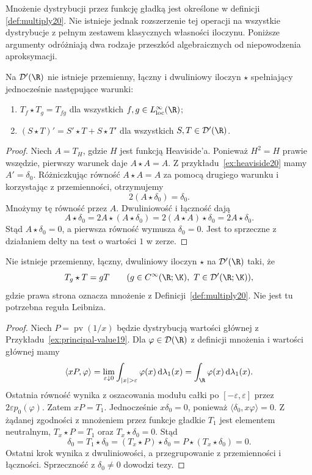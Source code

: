 Mnożenie dystrybucji przez funkcję gładką jest
określone w definicji \ref{def:multiply20}.
Nie istnieje jednak rozszerzenie tej operacji
na wszystkie dystrybucje z pełnym zestawem
klasycznych własności iloczynu. Poniższe argumenty odróżniają dwa rodzaje przeszkód
algebraicznych od niepowodzenia aproksymacji.
\begin{stwierdzenie}
\label{prop:dt-schwartz-obstruction}
Na $\mathcal D'(\R)$ nie istnieje przemienny, łączny
i dwuliniowy iloczyn $\star$ spełniający jednocześnie
następujące warunki:
\begin{enumerate}
\item $T_f\star T_g=T_{fg}$ dla wszystkich
$f,g\in L^\infty_{\mathrm{loc}}(\R)$;
\item $(S\star T)'=S'\star T+S\star T'$ dla wszystkich
$S,T\in\mathcal D'(\R)$.
\end{enumerate}
\end{stwierdzenie}
\begin{proof}
Niech $A=T_H$, gdzie $H$ jest funkcją Heaviside'a.
Ponieważ $H^2=H$ prawie wszędzie, pierwszy warunek
daje $A\star A=A$. Z przykładu~\ref{ex:heaviside20}
mamy $A'=\delta_0$. Różniczkując równość
$A\star A=A$ za pomocą drugiego warunku i korzystając
z przemienności, otrzymujemy
\[
 2(A\star\delta_0)=\delta_0.
\]
Mnożymy tę równość przez $A$. Dwuliniowość i łączność
dają
\[
 A\star\delta_0
 =2A\star(A\star\delta_0)
 =2(A\star A)\star\delta_0
 =2A\star\delta_0.
\]
Stąd $A\star\delta_0=0$, a pierwsza równość
wymusza $\delta_0=0$. Jest to sprzeczne
z działaniem delty na test o wartości $1$ w zerze.
\end{proof}

\begin{stwierdzenie}
\label{prop:dt-smooth-product-obstruction}
Nie istnieje przemienny, łączny, dwuliniowy iloczyn
$\star$ na $\mathcal D'(\R)$ taki, że
\[
 T_g\star T=gT
 \qquad(g\in C^\infty(\R;\K),\ T\in\mathcal D'(\R;\K)),
\]
gdzie prawa strona oznacza mnożenie z
Definicji~\ref{def:multiply20}.
Nie jest tu potrzebna reguła Leibniza.
\end{stwierdzenie}
\begin{proof}
Niech $P=\operatorname{pv}(1/x)$ będzie dystrybucją
wartości głównej z Przykładu~\ref{ex:principal-value19}.
Dla $\varphi\in\mathcal D(\R)$ z definicji mnożenia
i wartości głównej mamy
\[
 \langle xP,\varphi\rangle
 =\lim_{\varepsilon\downarrow0}
 \int_{|x|>\varepsilon}\varphi(x)\,\mathrm d\lambda_1(x)
 =\int_\R\varphi(x)\,\mathrm d\lambda_1(x).
\]
Ostatnia równość wynika z oszacowania modułu całki
po $[-\varepsilon,\varepsilon]$ przez
$2\varepsilon p_0(\varphi)$. Zatem $xP=T_1$.
Jednocześnie $x\delta_0=0$, ponieważ
$\langle\delta_0,x\varphi\rangle=0$.
Z żądanej zgodności z mnożeniem przez funkcje gładkie
$T_1$ jest elementem neutralnym, $T_x\star P=T_1$
oraz $T_x\star\delta_0=0$. Stąd
\[
 \delta_0=T_1\star\delta_0
 =(T_x\star P)\star\delta_0
 =P\star(T_x\star\delta_0)=0.
\]
Ostatni krok wynika z dwuliniowości, a przegrupowanie
z przemienności i łączności. Sprzeczność z
$\delta_0\ne0$ dowodzi tezy.
\end{proof}

